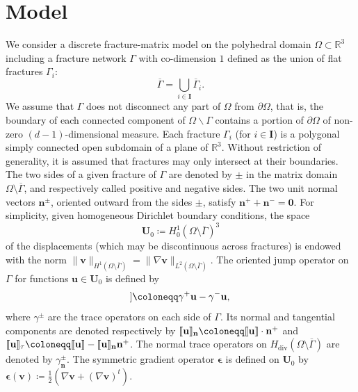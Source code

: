 \documentclass[a4paper,11pt]{article}
\theoremstyle{definition}
\theoremstyle{remark}
\newcommand{\bo}[1]{\mathbf{#1}}
\newcommand{\bos}[1]{\boldsymbol{#1}}
\def\R{\mathbb{R}}
\def\sjump#1{[\hskip -1.5pt[#1]\hskip -1.5pt]}
\def\O{\Omega}
\newcommand{\bspace}{\O\setminus\overline{\Gamma}}
\newcommand{\DIV}{\operatorname{\mathrm{div}}}
\begin{document}
\section{Model}\label{model}
We consider a discrete fracture-matrix model on the polyhedral domain $\O\subset\R^3$ including a fracture network $\Gamma$ with co-dimension $1$ defined as the union of flat fractures $\Gamma_i$:
\begin{equation*}
\overline{\Gamma}=\bigcup_{i\in\bo{I}}\overline{\Gamma}_i.
\end{equation*}
We assume that $\Gamma$ does not disconnect any part of $\Omega$ from $\partial\Omega$, that is, the boundary of each connected component of $\Omega\backslash \Gamma$ contains a portion of $\partial\Omega$ of non-zero $(d-1)$-dimensional measure. Each fracture $\Gamma_i$ (for $i\in\bo{I}$) is a polygonal simply connected open subdomain of a plane of $\R^3$. Without restriction of generality, it is assumed that fractures may only intersect at their boundaries. The two sides of a given fracture of $\Gamma$ are denoted by $\pm$ in the matrix domain $\O\setminus\overline{\Gamma}$, and respectively called positive and negative sides. The two unit normal vectors $\bo{n}^\pm$, oriented outward from the sides $\pm$, satisfy $\bo{n}^++\bo{n}^-=\bo{0}.$ For simplicity, given homogeneous Dirichlet boundary conditions, the space
\begin{equation*}
\bo{U}_0\coloneqq H^1_0(\O\setminus\overline{\Gamma})^3
\end{equation*}
of the displacements (which may be discontinuous across fractures) is endowed with the norm $\lVert\bo{v}\rVert_{H^1(\O\setminus\overline{\Gamma})}=\lVert \nabla\bo{v}\rVert_{L^2(\O\setminus\overline{\Gamma})}$. 
The oriented jump operator on $\Gamma$ for functions $\bo{u}\in\bo{U}_0$ is defined by
\begin{equation*}
\sjump{\bo{u}}\coloneqq\gamma^+\bo{u}-\gamma^-\bo{u},
\end{equation*}
where $\gamma^\pm$ are the trace operators on each side of $\Gamma$. Its normal and tangential components are denoted respectively by $\sjump{\bo{u}}_{\bo{n}}\coloneqq\sjump{\bo{u}}\cdot\bo{n}^+$ and $\sjump{\bo{u}}_\tau\coloneqq\sjump{\bo{u}}-\sjump{\bo{u}}_{\bo{n}}\bo{n}^+$. The normal trace operators on $H_{\DIV}(\bspace)$ are denoted by $\gamma_{\bo{n}}^\pm$. The symmetric gradient operator $\bos{\epsilon}$ is defined on $\bo{U}_0$ by $\bos{\epsilon}(\bo{v})\coloneqq\frac{1}{2}(\nabla \bo{v}+(\nabla \bo{v})^t)$.
\end{document}
